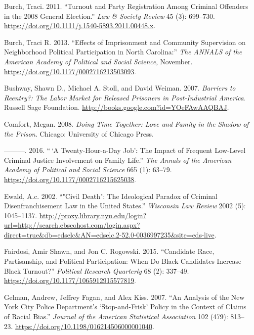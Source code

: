 \documentclass[
  12pt,
]{article}
\newlength{\cslhangindent}
\newenvironment{cslreferences}%
  {\setlength{\parindent}{0pt}%
  \everypar{\setlength{\hangindent}{\cslhangindent}}\ignorespaces}%
  {\par}
\begin{document}
\begin{cslreferences}
\leavevmode\hypertarget{ref-Burch2011}{}%
Burch, Traci. 2011. ``Turnout and Party Registration Among Criminal Offenders in the 2008 General Election.'' \emph{Law \& Society Review} 45 (3): 699--730. \url{https://doi.org/10.1111/j.1540-5893.2011.00448.x}.

\leavevmode\hypertarget{ref-Burch2013}{}%
Burch, Traci R. 2013. ``Effects of Imprisonment and Community Supervision on Neighborhood Political Participation in North Carolina:'' \emph{The ANNALS of the American Academy of Political and Social Science}, November. \url{https://doi.org/10.1177/0002716213503093}.

\leavevmode\hypertarget{ref-Bushway2007}{}%
Bushway, Shawn D., Michael A. Stoll, and David Weiman. 2007. \emph{Barriers to Reentry?: The Labor Market for Released Prisoners in Post-Industrial America}. Russell Sage Foundation. \url{http://books.google.com?id=YOeFAwAAQBAJ}.

\leavevmode\hypertarget{ref-Comfort2008}{}%
Comfort, Megan. 2008. \emph{Doing Time Together: Love and Family in the Shadow of the Prison}. Chicago: University of Chicago Press.

\leavevmode\hypertarget{ref-Comfort2016}{}%
---------. 2016. ``\,`A Twenty-Hour-a-Day Job': The Impact of Frequent Low-Level Criminal Justice Involvement on Family Life.'' \emph{The Annals of the American Academy of Political and Social Science} 665 (1): 63--79. \url{https://doi.org/10.1177/0002716215625038}.

\leavevmode\hypertarget{ref-Ewald2002}{}%
Ewald, A.c. 2002. ``"Civil Death": The Ideological Paradox of Criminal Disenfranchisement Law in the United States.'' \emph{Wisconsin Law Review} 2002 (5): 1045--1137. \url{http://proxy.library.nyu.edu/login?url=http://search.ebscohost.com/login.aspx?direct=true\&db=edselc\&AN=edselc.2-52.0-0036997235\&site=eds-live}.

\leavevmode\hypertarget{ref-Fairdosi2015}{}%
Fairdosi, Amir Shawn, and Jon C. Rogowski. 2015. ``Candidate Race, Partisanship, and Political Participation: When Do Black Candidates Increase Black Turnout?'' \emph{Political Research Quarterly} 68 (2): 337--49. \url{https://doi.org/10.1177/1065912915577819}.

\leavevmode\hypertarget{ref-Gelman2007}{}%
Gelman, Andrew, Jeffrey Fagan, and Alex Kiss. 2007. ``An Analysis of the New York City Police Department's `Stop-and-Frisk' Policy in the Context of Claims of Racial Bias.'' \emph{Journal of the American Statistical Association} 102 (479): 813--23. \url{https://doi.org/10.1198/016214506000001040}.


\end{cslreferences}
\end{document}
